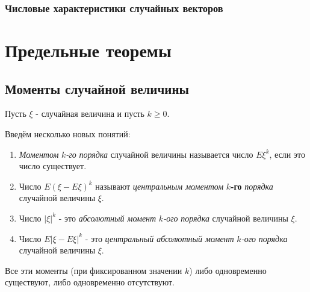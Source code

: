 \subsubsection{Числовые характеристики случайных векторов}
\begin{figure}[H]
\end{figure}

\section{Предельные теоремы}

\subsection{Моменты случайной величины}

Пусть $\xi$ - случайная величина и пусть $k \ge 0$.

\begin{definition}
	Введём несколько новых понятий:
	\begin{enumerate}
		\item \textit{Моментом} $k$\textit{-го} \textit{порядка} случайной величины называется число $E\xi^k$, если это число существует.
		\item Число $E(\xi - E\xi)^k$ называют \textit{центральным моментом} $k$\textbf{-го} \textit{порядка} случайной величины $\xi$.
		\item Число $|\xi|^k$ - это \textit{абсолютный момент} $k$\textit{-ого} \textit{порядка} случайной величины $\xi$.
		\item Число $E|\xi - E\xi|^k$ - это \textit{центральный абсолютный момент} $k$\textit{-ого} \textit{порядка} случайной величины $\xi$.
	\end{enumerate}
\end{definition}
\begin{remark}
	Все эти моменты (при фиксированном значении $k$) либо одновременно существуют, либо одновременно отсутствуют.
\end{remark}

